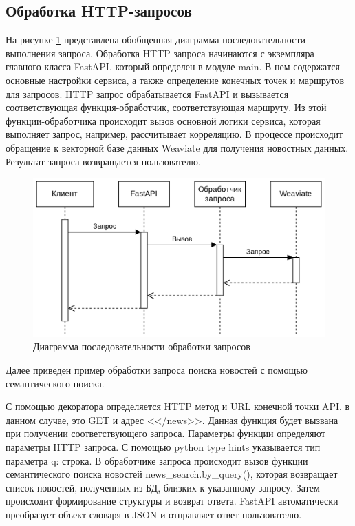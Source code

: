 \subsection{Обработка HTTP-запросов}

На рисунке \ref{img:sequence-diagram} представлена обобщенная диаграмма последовательности выполнения запроса. Обработка HTTP запроса начинаются с экземпляра главного класса FastAPI, который определен в модуле main. В нем содержатся основные настройки сервиса, а также определение конечных точек и маршрутов для запросов. HTTP запрос обрабатывается FastAPI и вызывается соответствующая функция-обработчик, соответствующая маршруту. Из этой функции-обработчика происходит вызов основной логики сервиса, которая выполняет запрос, например, рассчитывает корреляцию. В процессе происходит обращение к векторной базе данных Weaviate для получения новостных данных. Результат запроса возвращается пользователю.

\begin{figure}[h]
    \centering
    \includegraphics[width=\linewidth]{images/sequence-diagram.png}
    \caption{Диаграмма последовательности обработки запросов}
    \label{img:sequence-diagram}
\end{figure}


Далее приведен пример обработки запроса поиска новостей с помощью семантического поиска.

С помощью декоратора определяется HTTP метод и URL конечной точки API, в данном случае, это GET и адрес <</news>>. Данная функция будет вызвана при получении соответствующего запроса. Параметры функции определяют параметры HTTP запроса. С помощью python type hints указывается тип параметра q: строка. В обработчике запроса происходит вызов функции семантического поиска новостей news\_search.by\_query(), которая возвращает список новостей, полученных из БД, близких к указанному запросу. Затем происходит формирование структуры и возврат ответа. FastAPI автоматически преобразует объект словаря в JSON и отправляет ответ пользователю.

